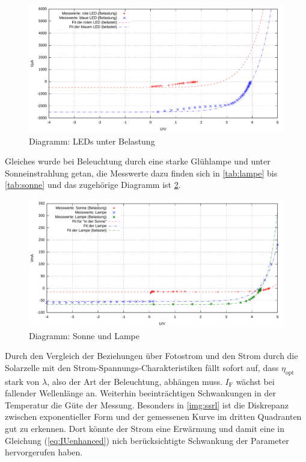 \documentclass[numbers=noenddot,12pt,a4paper]{scrartcl}
\newcommand{\ix}[1]{_\text{#1}}
\begin{document}
\begin{figure}[H]
	\includegraphics[width=1\textwidth]{messwerte/stromspannungspannungsrichtigbelastungled.pdf}
	\caption{Diagramm: LEDs unter Belastung} \label{img:ssrbl}
\end{figure}
Gleiches wurde bei Beleuchtung durch eine starke Glühlampe und unter Sonneinstrahlung getan, die Messwerte dazu finden sich in \ref{tab:lampe} bis \ref{tab:sonne} und das zugehörige Diagramm ist \ref{img:sslus}.
\begin{figure}[H]
	\includegraphics[width=1\textwidth]{messwerte/stromspannunglampeundsonne.pdf}
	\caption{Diagramm: Sonne und Lampe} \label{img:sslus}
\end{figure}
Durch den Vergleich der Beziehungen über Fotostrom und den Strom durch die Solarzelle mit den Strom-Spannungs-Charakteristiken fällt sofort auf, dass $\eta\ix{opt}$ stark von $\lambda$, also der Art der Beleuchtung, abhängen muss. $I\ix{F}$ wächst bei fallender Wellenlänge an. Weiterhin beeinträchtigen Schwankungen in der Temperatur die Güte der Messung. Besonders in \ref{img:ssrl} ist die Diskrepanz zwischen exponentieller Form und der gemessenen Kurve im dritten Quadranten gut zu erkennen. Dort könnte der Strom eine Erwärmung und damit eine in Gleichung (\ref{eq:IUenhanced}) nich berücksichtigte Schwankung der Parameter hervorgerufen haben.\\
\end{document}

